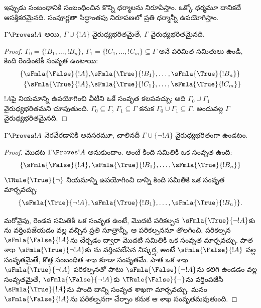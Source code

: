 \documentclass[../../../include/open-logic-section]{subfiles}
\begin{document}
      {}
      {}


ఇప్పుడు  సంబంధానికి సంబంధించిన కొన్ని ధర్మాలను నిరూపిస్తాం. ఒక్కో ధర్మమూ దానికదే ఆసక్తికరమైనది. సంపూర్ణతా
సిద్ధాంతపు నిరూపణలో ప్రతి ధర్మాన్నీ ఉపయోగిస్తాం.

\begin{prop}
  $\Gamma \Proves !A$ అయి, $\Gamma \cup \{!A\}$ వైరుధ్యభరితమైతే,
  $\Gamma$ వైరుధ్యభరితమైనది.
\end{prop}

\begin{proof}
$\Gamma_0 = \{!B_1, \dots, !B_n\}$,
$\Gamma_1 =\{!C_1, \dots, !C_m\} \subseteq \Gamma$ అనే పరిమిత
సమితులు ఉండి, కింది రెండింటికీ సంవృత  ఉంటాయి:
  \begin{align*}
    \{\sFmla{\False}{!A}, &
    \sFmla{\True}{!B_1}, \dots, \sFmla{\True}{!B_n}\} \\
    \{\sFmla{\True}{!A}, &
    \sFmla{\True}{!C_1}, \dots, \sFmla{\True}{!C_m}\}
  \end{align*}
  $!A$పై \Cut{} నియమాన్ని ఉపయోగించి వీటిని ఒకే సంవృత
   కలపవచ్చు; అది $\Gamma_0 \cup \Gamma_1$
  వైరుధ్యభరితమని చూపుతుంది. $\Gamma_0 \subseteq \Gamma$,
  $\Gamma_1 \subseteq \Gamma$ కనుక $\Gamma_0 \cup
  \Gamma_1 \subseteq \Gamma$. అందువల్ల $\Gamma$ వైరుధ్యభరితమైనది.
\end{proof}

\begin{prop}
$\Gamma \Proves !A$ నెరవేరడానికి అవసరమూ, చాలినదీ $\Gamma \cup \{\lnot !A\}$
వైరుధ్యభరితంగా ఉండటం.
\end{prop}

\begin{proof}
మొదట $\Gamma \Proves !A$ అనుకుందాం. అంటే కింది సమితికి ఒక సంవృత
 ఉంది:
\[
\{\sFmla{\False}{!A},
\sFmla{\True}{!B_1}, \dots, \sFmla{\True}{!B_n}\}
\]
$\TRule{\True}{\lnot}$ నియమాన్ని ఉపయోగించి దాన్ని కింది సమితికి
ఒక సంవృత  మార్చవచ్చు:
\[
\{\sFmla{\True}{\lnot !A},
\sFmla{\True}{!B_1}, \dots, \sFmla{\True}{!B_n}\}.
\]

మరోవైపు, రెండవ సమితికి ఒక సంవృత  ఉంటే, మొదటి పరికల్పన
$\sFmla{\True}{\lnot !A}$కు \TRule{\True}{\lnot}ను వర్తింపజేయడం
వల్ల వచ్చిన ప్రతి సూత్రాన్నీ, ఆ పరికల్పననూ తొలగించి, పరికల్పన
$\sFmla{\False}{!A}$ను చేర్చడం ద్వారా మొదటి సమితికి ఒక సంవృత
 మార్చవచ్చు. పాత శాఖ
$\sFmla{\True}{\lnot !A}$కు \TRule{\True}{\lnot}ను వర్తింపజేసిన
నిష్కర్ష, అంటే $\sFmla{\False}{!A}$ వల్ల సంవృతమైతే, కొత్త
 సంబంధిత శాఖ కూడా సంవృతమే. పాత  ఒక శాఖ
$\sFmla{\True}{\lnot !A}$ పరికల్పనతో పాటు
$\sFmla{\False}{\lnot !A}$ను కలిగి ఉండడం వల్ల సంవృతమైతే,
$\sFmla{\False}{\lnot !A}$కు $\TRule{\False}{\lnot}$ను
వర్తింపజేసి $\sFmla{\True}{!A}$ను పొంది దాన్ని సంవృత శాఖగా
మార్చవచ్చు. మనం $\sFmla{\False}{!A}$ను పరికల్పనగా చేర్చాం కనుక ఆ
శాఖ సంవృతమవుతుంది.
\end{proof}
\end{document}
